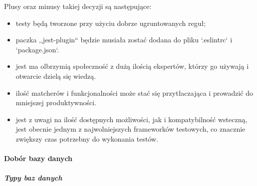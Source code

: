 \documentclass[12pt, a4paper, twoside, openany]{book}
\begin{document}
Plusy oraz minusy takiej decyzji są następujące:
\begin{itemize}
    \item testy będą tworzone przy użyciu dobrze ugruntowanych reguł;
    \item paczka ,,jest-plugin`` będzie musiała zostać dodana do pliku `.eslintrc` i `package.json`.
    \item jest ma olbrzymią społeczność z dużą ilością ekspertów, którzy go używają i otwarcie dzielą się wiedzą.
    \item ilość matcherów i funkcjonalności może stać się przytłaczająca i prowadzić do mniejszej produktywności.
    \item jest z uwagi na ilość dostępnych możliwości, jak i kompatybilność wsteczną, jest obecnie jednym z najwolniejszych frameworków testowych, co znacznie zwiększy czas potrzebny do wykonania testów.
\end{itemize}

\paragraph{Dobór bazy danych}
\subparagraph{Typy baz danych\\}
\end{document}

